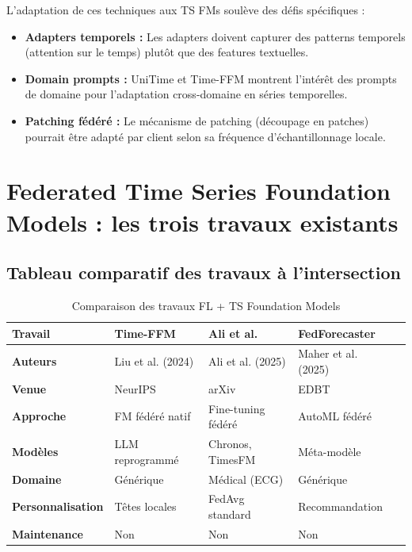\documentclass[12pt, a4paper]{report}
\begin{document}
L'adaptation de ces techniques aux TS FMs soulève des défis spécifiques :

\begin{itemize}
  \item \textbf{Adapters temporels :} Les adapters doivent capturer des patterns
  temporels (attention sur le temps) plutôt que des features textuelles.
  \item \textbf{Domain prompts :} UniTime et Time-FFM montrent l'intérêt des prompts
  de domaine pour l'adaptation cross-domaine en séries temporelles.
  \item \textbf{Patching fédéré :} Le mécanisme de patching (découpage en patches)
  pourrait être adapté par client selon sa fréquence d'échantillonnage locale.
\end{itemize}

\section{Federated Time Series Foundation Models : les trois travaux existants}

\subsection{Tableau comparatif des travaux à l'intersection}

\begin{table}[h!]
\centering
\caption{Comparaison des travaux FL + TS Foundation Models}
\label{tab:fl-tsfm-works}
\renewcommand{\arraystretch}{1.6}
\begin{tabularx}{\textwidth}{>{\bfseries}p{2.5cm}XXXX}
\toprule
\textbf{Travail} & \textbf{Time-FFM} & \textbf{Ali et al.} & \textbf{FedForecaster} \\
\midrule
Auteurs & Liu et al. (2024) & Ali et al. (2025) & Maher et al. (2025) \\
Venue & NeurIPS & arXiv & EDBT \\
Approche & FM fédéré natif & Fine-tuning fédéré & AutoML fédéré \\
Modèles & LLM reprogrammé & Chronos, TimesFM & Méta-modèle \\
Domaine & Générique & Médical (ECG) & Générique \\
Personnalisation & Têtes locales & FedAvg standard & Recommandation \\
Maintenance & Non & Non & Non \\
\bottomrule
\end{tabularx}
\end{table}
\end{document}
